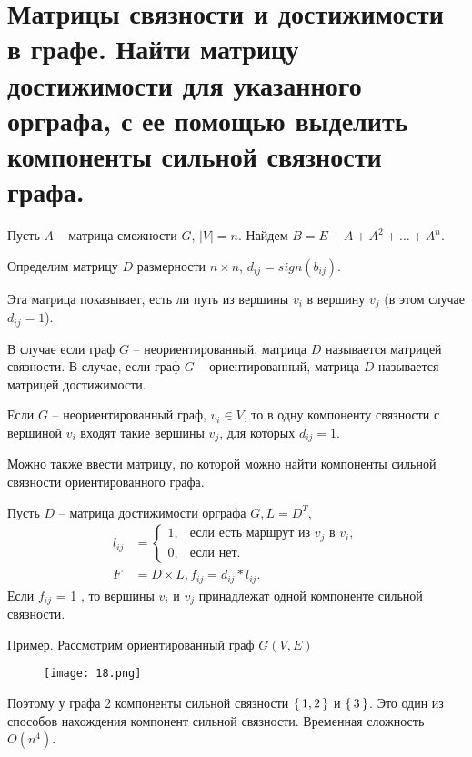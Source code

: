 \section{Матрицы связности и достижимости в графе. Найти матрицу достижимости для указанного 
орграфа, с ее помощью выделить компоненты сильной связности графа.}

Пусть $A$ -- матрица смежности $G$, $|V|=n$. Найдем $B=E+A+A^2+ \dots +A^n$.

Определим матрицу $D$ размерности $n \times n$, $d_{ij}=sign(b_{ij})$.

Эта матрица показывает, есть ли путь из вершины $v_i$ в вершину $v_j$ (в этом
случае $d_{ij}=1$).

\begin{definition}
    В случае если граф $G$ -- неориентированный, матрица $D$
    называется матрицей связности. В случае, если граф $G$ -- ориентированный,
    матрица $D$ называется матрицей достижимости.
\end{definition}

Если $G$ -- неориентированный граф, $v_i \in V$, то в одну компоненту связности с
вершиной $v_i$ входят такие вершины $v_j$, для которых $d_{ij} = 1$.

Можно также ввести матрицу, по которой можно найти компоненты сильной
связности ориентированного графа.

Пусть $D$ -- матрица достижимости орграфа $G, L=D^T$,
\begin{align*}
    l_{ij}&=\begin{cases}
        1,& \text{если есть маршрут из $v_j$ в $v_i$},\\
        0,& \text{если нет}.
        \end{cases} \\
    F &= D \times L, f_{ij}=d_{ij} * l_{ij}.
\end{align*}
Если $f_{ij}$ = 1 , то вершины $v_i$ и $v_j$ принадлежат одной компоненте сильной
связности.

Пример. Рассмотрим ориентированный граф $G(V,E)$
\begin{figure}[h]
    \centering
    \texttt{[image: 18.png]}
\end{figure}

Поэтому у графа 2 компоненты сильной связности $\set{1,2}$ и $\set{3}$.
Это один из способов нахождения компонент сильной связности. Временная
сложность $O(n^4)$.